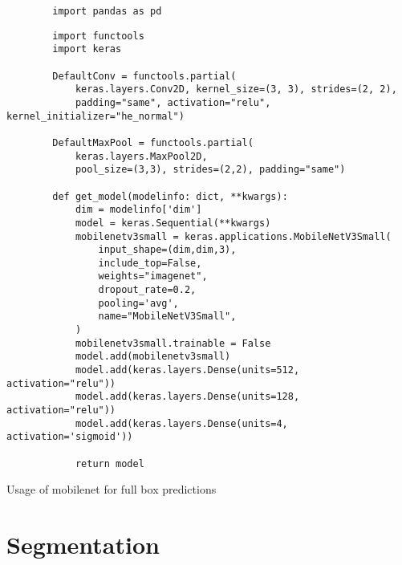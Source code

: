\begin{listing}
    \begin{verbatim}
        import pandas as pd
    \end{verbatim}
    \caption[]{}
    \label{code:keras-googlenet-small-replication}
\end{listing}

\begin{listing}
    \begin{verbatim}
        import functools
        import keras

        DefaultConv = functools.partial(
            keras.layers.Conv2D, kernel_size=(3, 3), strides=(2, 2),
            padding="same", activation="relu", kernel_initializer="he_normal")

        DefaultMaxPool = functools.partial(
            keras.layers.MaxPool2D,
            pool_size=(3,3), strides=(2,2), padding="same")

        def get_model(modelinfo: dict, **kwargs):
            dim = modelinfo['dim']
            model = keras.Sequential(**kwargs)
            mobilenetv3small = keras.applications.MobileNetV3Small(
                input_shape=(dim,dim,3),
                include_top=False,
                weights="imagenet",
                dropout_rate=0.2,
                pooling='avg',
                name="MobileNetV3Small",
            )
            mobilenetv3small.trainable = False
            model.add(mobilenetv3small)
            model.add(keras.layers.Dense(units=512, activation="relu"))
            model.add(keras.layers.Dense(units=128, activation="relu"))
            model.add(keras.layers.Dense(units=4, activation='sigmoid'))

            return model
    \end{verbatim}
    \caption[keras mobilenet full boxes]{Usage of mobilenet for full box predictions}
    \label{code:keras-mobilenetv3small}
\end{listing}



\section{Segmentation}
\label{sec:code-segmentation}

